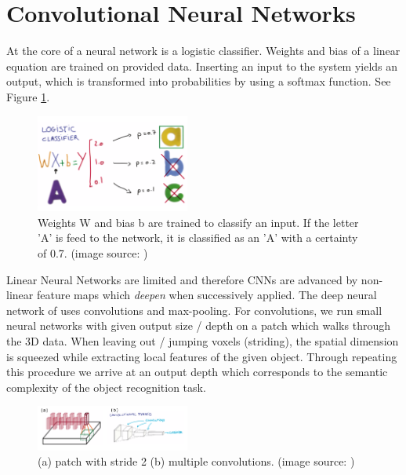 \documentclass[10pt,twocolumn,letterpaper]{article}
\begin{document}
\section{Convolutional Neural Networks}

At the core of a neural network is a logistic classifier. 
Weights and bias of a linear equation are trained on provided data. Inserting an input to the system yields an output, which is
transformed into probabilities by using a softmax function. See Figure \ref{fig:classifier}.

\begin{figure}[h]
	\centering
	\includegraphics[width=0.45\textwidth]{figures/classifier}
	\caption{Weights W and bias b are trained to classify an input. If the letter 'A' is feed to the network,
	it is classified as an 'A' with a certainty of 0.7. (image source: \cite{udacity})}
	\label{fig:classifier}
\end{figure}

Linear Neural Networks are limited and therefore CNNs are advanced by non-linear feature maps which \textit{deepen} 
when successively applied. The deep neural network of \cite{voxnet} uses convolutions and max-pooling.
For convolutions, we run small neural networks with given output size / depth on a patch which walks through the 3D data. 
When leaving out / jumping voxels (striding),
the spatial dimension is squeezed while extracting local features of the given object. 
Through repeating this procedure we arrive at an output depth which corresponds to the semantic complexity of the object recognition task. 

\begin{figure}[h]
	\includegraphics[width=0.45\textwidth]{figures/conv}
	\caption{(a) patch with stride 2 (b) multiple convolutions. (image source: \cite{udacity})}
	\label{fig:convolution}
\end{figure}
\end{document}
